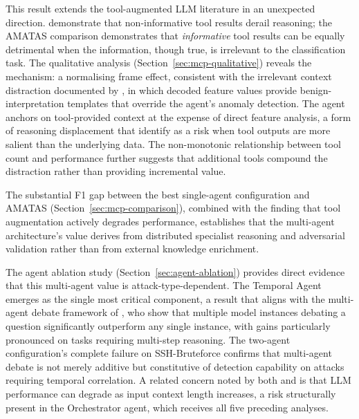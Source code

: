 \documentclass[../main.tex]{subfiles}
\begin{document}
This result extends the tool-augmented LLM literature in an unexpected direction. \textcite{Yao2023} demonstrate that non-informative tool results derail reasoning; the AMATAS comparison demonstrates that \textit{informative} tool results can be equally detrimental when the information, though true, is irrelevant to the classification task. The qualitative analysis (Section~\ref{sec:mcp-qualitative}) reveals the mechanism: a normalising frame effect, consistent with the irrelevant context distraction documented by \textcite{Shi2023}, in which decoded feature values provide benign-interpretation templates that override the agent's anomaly detection. The agent anchors on tool-provided context at the expense of direct feature analysis, a form of reasoning displacement that \textcite{Qin2024} identify as a risk when tool outputs are more salient than the underlying data. The non-monotonic relationship between tool count and performance further suggests that additional tools compound the distraction rather than providing incremental value.

The substantial F1 gap between the best single-agent configuration and AMATAS (Section~\ref{sec:mcp-comparison}), combined with the finding that tool augmentation actively degrades performance, establishes that the multi-agent architecture's value derives from distributed specialist reasoning and adversarial validation rather than from external knowledge enrichment.

The agent ablation study (Section~\ref{sec:agent-ablation}) provides direct evidence that this multi-agent value is attack-type-dependent. The Temporal Agent emerges as the single most critical component, a result that aligns with the multi-agent debate framework of \textcite{Du2023}, who show that multiple model instances debating a question significantly outperform any single instance, with gains particularly pronounced on tasks requiring multi-step reasoning. The two-agent configuration's complete failure on SSH-Bruteforce confirms that multi-agent debate is not merely additive but constitutive of detection capability on attacks requiring temporal correlation. A related concern noted by both \citeauthor{Du2023} and \textcite{Chan2023} is that LLM performance can degrade as input context length increases, a risk structurally present in the Orchestrator agent, which receives all five preceding analyses.
\end{document}
